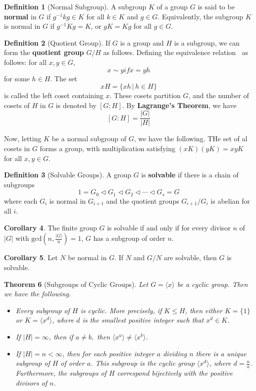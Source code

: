 \documentclass[10pt, oneside, reqno]{amsart}
\theoremstyle{plain}%
\newtheorem{thm}{Theorem}[section]
\theoremstyle{definition}
\newtheorem{defn}[thm]{Definition}
\newtheorem{cor}[thm]{Corollary}
\theoremstyle{remark}
\newcommand{\gener}[1]{\langle #1 \rangle}
\newcommand{\xdeg}[2]{[#1 : #2]}
\begin{document}
\begin{defn}[Normal Subgroup]
	A subgroup $K$ of a group $G$ is said to be \textbf{normal} in $G$ if $g^{-1} k g \in K$ for all $k \in K$ and $g \in G$.  Equivalently, the subgroup $K$ is normal in $G$ if $g^{-1}Kg = K$, or $gK = Kg$ for all $g \in G$.
\end{defn}

\begin{defn}[Quotient Group]
	If $G$ is a group and $H$ is a subgroup, we can form the \textbf{quotient group} $G/H$ as follows.
	Defining the equivalence relation $~$ as follows: for all $x,y \in G$, \[
		x \sim y if x = yh
	\] for some $h \in H$.  The set \[
		xH = \{xh \, | \, h \in H \}
	\] is called the left coset containing $x$.  These cosets partition $G$, and the number of cosets of $H$ in $G$ is denoted by $\xdeg{G}{H}$.  By \textbf{Lagrange's Theorem}, we have \[
		\xdeg{G}{H} = \frac{|G|}{|H|}
	\]
	
	Now, letting $K$ be a normal subgroup of $G$, we have the following.
	THe set of al cosets in $G$ forms a group, with multiplication satisfying $(xK)(yK) = xyK$ for all $x,y \in G$.
\end{defn}


\begin{defn}[Solvable Groups]
	A group $G$ is \textbf{solvable} if there is a chain of subgroups\[
		1 = G_0 \lhd G_1 \lhd G_2 \lhd \cdots \lhd G_s = G
	\] where each $G_i$ is normal in $G_{i+1}$ and the quotient groups $G_{i+1}/G_i$ is abelian for all $i$.
\end{defn}

\begin{cor}
	The finite group $G$ is solvable if and only if for every divisor $n$ of $|G|$ with $\text{gcd}(n, \frac{|G|}{n}) = 1$, $G$ has a subgroup of order $n$.
\end{cor}

\begin{cor} Let $N$ be normal in $G$.
	If $N$ and $G/N$ are solvable, then $G$ is solvable.
\end{cor}


\begin{thm}[Subgroups of Cyclic Groups]
	Let $G = \langle x \rangle$ be a cyclic group.  Then we have the following.
	\begin{itemize}
		\item Every subgroup of $H$ is cyclic.   More precisely, if $K \leq H$, then either $K = \{1\}$ or $K = \langle x^d \rangle$, where $d$ is the smallest positive integer such that $x^d \in K$.
		\item If $|H| = \infty$, then if $a \neq b,$ then $\gener{x^a} \neq \gener{x^b}$. 
		\item If $|H| = n < \infty$, then for each positive integer $a$ dividing $n$ there is a unique subgroup of $H$ of order $a$.  This subgroup is the cyclic group $\gener{x^d}$, where $d = \frac{n}{a}$.  Furthermore, the subgroups of $H$ correspond bijectively with the positive divisors of $n$.
	\end{itemize}
\end{thm}
\end{document}
